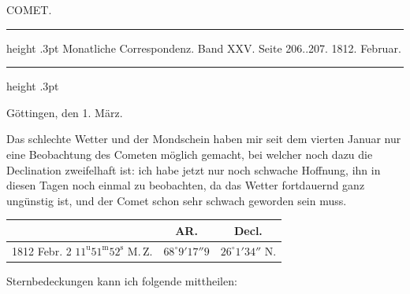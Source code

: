 \par\bigskip
{}
\hypertarget{native-352-lower}{}\label{native-352-lower}
\begin{center}\large COMET.\end{center}
\begin{center}
\parbox{.76\linewidth}{%
\centering\fontsize{8.2}{10.2}\selectfont
\hrule height .3pt\relax\vspace{2.5pt}
Monatliche Correspondenz. Band XXV. Seite 206..207. 1812. Februar.\par
\vspace{2.5pt}\hrule height .3pt\relax
}
\end{center}

\begin{flushright}Göttingen, den 1. März.\end{flushright}
\par\indent Das schlechte Wetter und der Mondschein haben mir seit dem vierten Januar nur eine Beobachtung des Cometen möglich gemacht, bei welcher noch dazu die Declination zweifelhaft ist: ich habe jetzt nur noch schwache Hoffnung, ihn in diesen Tagen noch einmal zu beobachten, da das Wetter fortdauernd ganz ungünstig ist, und der Comet schon sehr schwach geworden sein muss.

\begin{center}
\fontsize{10}{12}\selectfont\setlength{\tabcolsep}{4pt}\begin{tabular}{l|c|c}
 & AR. & Decl. \\
\hline
1812 Febr. 2 \quad $11^{\mathrm{u}}51^{\mathrm{m}}52^{\mathrm{s}}$ M.\,Z. & $68^\circ9'17''9$ & $26^\circ1'34''$ N. \\
\end{tabular}
\end{center}

\par\indent Sternbedeckungen kann ich folgende mittheilen:

